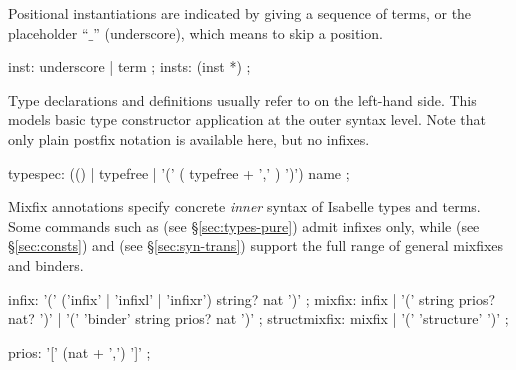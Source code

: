 \begin{isabellebody}
\begin{isamarkuptext}
  Positional instantiations are indicated by giving a sequence of
  terms, or the placeholder ``$\_$'' (underscore), which means to skip
  a position.

  \begin{rail}
    inst: underscore | term
    ;
    insts: (inst *)
    ;
  \end{rail}

  Type declarations and definitions usually refer to
   on the left-hand side.  This models basic
  type constructor application at the outer syntax level.  Note that
  only plain postfix notation is available here, but no infixes.

  \begin{rail}
    typespec: (() | typefree | '(' ( typefree + ',' ) ')') name
    ;
  \end{rail}%
\end{isamarkuptext}%
\isamarkuptrue%
%
\isamarkuptrue%
%
\begin{isamarkuptext}%
Mixfix annotations specify concrete \emph{inner} syntax of Isabelle
  types and terms.  Some commands such as  (see
  \S\ref{sec:types-pure}) admit infixes only, while  (see \S\ref{sec:consts}) and  (see
  \S\ref{sec:syn-trans}) support the full range of general mixfixes
  and binders.

  \begin{rail}
    infix: '(' ('infix' | 'infixl' | 'infixr') string? nat ')'
    ;
    mixfix: infix | '(' string prios? nat? ')' | '(' 'binder' string prios? nat ')'
    ;
    structmixfix: mixfix | '(' 'structure' ')'
    ;

    prios: '[' (nat + ',') ']'
    ;
  \end{rail}


\end{isamarkuptext}
\end{isabellebody}
